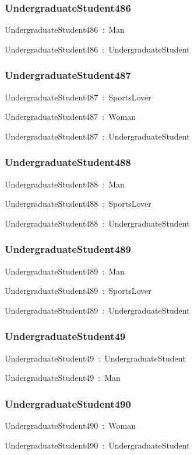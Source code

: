 \documentclass{article}
\begin{document}
\subsubsection*{UndergraduateStudent486}

UndergraduateStudent486~:~Man

UndergraduateStudent486~:~UndergraduateStudent

\subsubsection*{UndergraduateStudent487}

UndergraduateStudent487~:~SportsLover

UndergraduateStudent487~:~Woman

UndergraduateStudent487~:~UndergraduateStudent

\subsubsection*{UndergraduateStudent488}

UndergraduateStudent488~:~Man

UndergraduateStudent488~:~SportsLover

UndergraduateStudent488~:~UndergraduateStudent

\subsubsection*{UndergraduateStudent489}

UndergraduateStudent489~:~Man

UndergraduateStudent489~:~SportsLover

UndergraduateStudent489~:~UndergraduateStudent

\subsubsection*{UndergraduateStudent49}

UndergraduateStudent49~:~UndergraduateStudent

UndergraduateStudent49~:~Man

\subsubsection*{UndergraduateStudent490}

UndergraduateStudent490~:~Woman

UndergraduateStudent490~:~UndergraduateStudent
\end{document}
